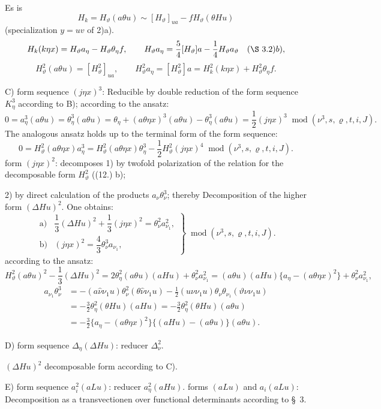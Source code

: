 \documentclass[11pt]{article}
\newcommand{\A}{\Delta}
\newcommand{\R}{\varrho}
\newcommand{\modu}[1]{\;\operatorname{mod} #1}
\begin{document}
Es is
\[
H_k=H_\vartheta(a\theta u)\sim [H_\vartheta]_{ua}-fH_\vartheta(\theta Hu)
\]
(specialization $y=uv$ of 2)a).
\[
H_k(k\eta x)=H_\vartheta a_\eta-H_\vartheta\theta_\eta f,
\qquad
H_\vartheta a_\eta=\frac54[H_\vartheta]a-\frac14H_\vartheta a_\vartheta
\quad(\S\ 3. 2)b),
\]
\[
H_\vartheta^2(a\theta u)=[H_\vartheta^2]_{ua},
\qquad
H_\vartheta^2a_\eta=[H_\vartheta^2]a=H_k^2(k\eta x)+H_\vartheta^2\theta_\eta f.
\]

\noindent C) form sequence $(j\eta x)^3$: Reducible by double reduction of the form sequence $K_\eta^3$ according to B); according to the ansatz:
\[
0=a_\eta^3(a\theta u)=\theta_\eta^3(a\theta u)
=\theta_\eta+(a\theta\eta x)^3(a\theta u)-\theta_\eta^3(a\theta u)
=\frac12(j\eta x)^3\modu{(\nu^3,s,\R,t,i,J)}.
\]
The analogous ansatz holds up to the terminal form of the form sequence:
\[
0=H_\vartheta^2(a\theta\eta x)a_\eta^3
=H_\vartheta^2(a\theta\eta x)\theta_\eta^3
-\frac12H_\vartheta^2(j\eta x)^4\modu{(\nu^3,s,\R,t,i,J)}.
\]
form $(j\eta x)^2$: decomposes 1) by twofold polarization of the relation for the decomposable form $H_\vartheta^2$ ((12.) b);

2) by direct calculation of the products $a_\nu\theta_\nu^3$; thereby Decomposition of the higher form $(\A Hu)^2$. One obtains:
\[
\tag{18}
\left.\begin{array}{ll}
\text{a)}&\dfrac13(\A Hu)^2+\dfrac13(j\eta x)^2=\theta_\nu^2a_{\nu_1}^2,\\[0.6em]
\text{b)}&(j\eta x)^2=\dfrac43\theta_\nu^3a_{\nu_1},
\end{array}\right\}\modu{(\nu^3,s,\R,t,i,J)}.
\]
according to the ansatz:
\[
H_\vartheta^2(a\theta u)^2-\frac13(\A Hu)^2
=2\theta_\eta^2(a\theta u)(aHu)+\theta_\nu^2a_{\nu_1}^2
=(a\theta u)(aHu)\{a_\eta-(a\theta\eta x)^2\}+\theta_\nu^2a_{\nu_1}^2,
\]
\[
\begin{aligned}
a_{\nu_1}\theta_\nu^3
&=-(a\widehat{\nu}\nu_1u)\theta_\nu^2(\theta\widehat{\nu}\nu_1u)
-\frac12(u\nu\nu_1u)\theta_\nu\theta_{\nu_1}(\vartheta\nu\nu_1u)\\
&=-\frac32\theta_\eta^2(\theta Hu)(aHu)
=-\frac32\theta_\eta^2(\theta Hu)(a\theta u)\\
&=-\frac32\{a_\eta-(a\theta\eta x)^2\}\{(aHu)-(a\theta u)\}(a\theta u).
\end{aligned}
\]

\noindent D) form sequence $\A_\eta(\A Hu)$: reducer $\A_\nu^2$.

$(\A Hu)^2$ decomposable form according to C).

\noindent E) form sequence $a_i^2(aLu)$: reducer $a_\eta^2(aHu)$. forms $(aLu)$ and $a_i(aLu)$: Decomposition as a transvectionen over functional determinants according to \S\ 3.
\end{document}
